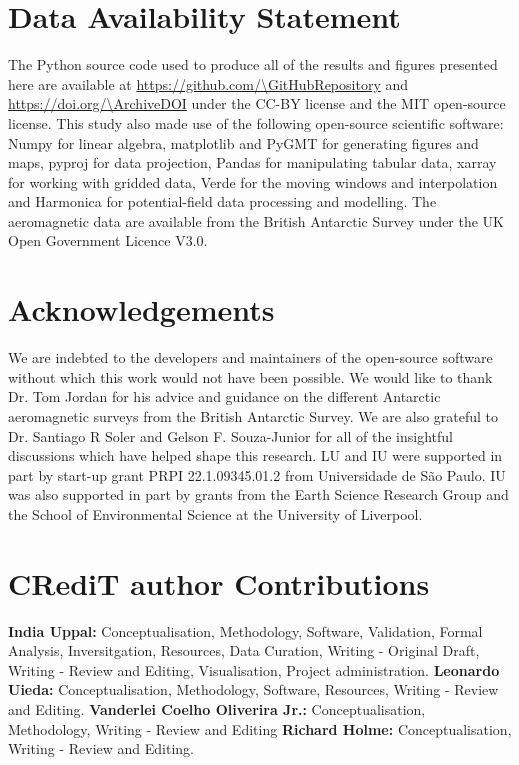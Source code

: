 \section{Data Availability Statement}

The Python source code used to produce all of the results and figures presented here are available at \url{https://github.com/\GitHubRepository} and
\url{https://doi.org/\ArchiveDOI} under the CC-BY license and the MIT open-source license. This study also made use of the following open-source scientific software: Numpy \citep{numpy} for linear algebra, matplotlib \citep{matplotlib} and PyGMT \citep{pygmt} for generating figures and maps, pyproj \citep{pyproj} for data projection, Pandas \citep{pandas} for manipulating tabular data, xarray \citep{xarray} for working with gridded data, Verde \citep{verde} for the moving windows and interpolation and Harmonica \citep{harmonica} for potential-field data processing and modelling. The aeromagnetic data are available from the British Antarctic Survey \citep{ICEGRAV_data} under the UK Open Government Licence V3.0.

\section{Acknowledgements}

We are indebted to the developers and maintainers of the open-source software without which this work would not have been possible. We would like to thank Dr. Tom Jordan for his advice and guidance on the different Antarctic aeromagnetic surveys from the British Antarctic Survey. We are also grateful to Dr. Santiago R Soler and Gelson F. Souza-Junior for all of the insightful discussions which have helped shape this research. LU and IU were supported in part by start-up grant PRPI 22.1.09345.01.2 from Universidade de São Paulo. IU was also supported in part by grants from the Earth Science Research Group and the School of Environmental Science at the University of Liverpool.

\section{CRediT author Contributions}

\textbf{India Uppal:} Conceptualisation, Methodology, Software, Validation, Formal Analysis, Inversitgation, Resources, Data Curation, Writing - Original Draft, Writing - Review and Editing, Visualisation, Project administration.
\textbf{Leonardo Uieda:} Conceptualisation, Methodology, Software, Resources, Writing - Review and Editing.
\textbf{Vanderlei Coelho Oliverira Jr.:} Conceptualisation, Methodology, Writing - Review and Editing
\textbf{Richard Holme:} Conceptualisation, Writing - Review and Editing.